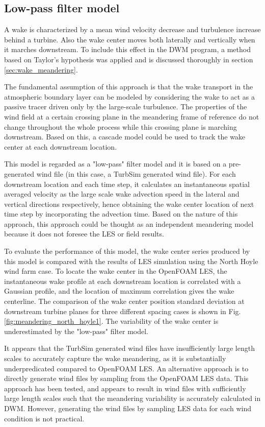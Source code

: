 \documentclass{umthesis}
\begin{document}
\subsection{Low-pass filter model}
A wake is characterized by a mean wind velocity decrease and turbulence increase behind a turbine. Also the wake center moves both laterally and vertically when it marches downstream. To include this effect in the DWM program, a method based on Taylor's hypothesis was applied and is discussed thoroughly in section \ref{sec:wake_meandering}. 

The fundamental assumption of this approach is that the wake transport in the atmospheric boundary layer can be modeled by considering the wake to act as a passive tracer driven only by the large-scale turbulence. The properties of the wind field at a certain crossing plane in the meandering frame of reference do not change throughout the whole process while this crossing plane is marching downstream. Based on this, a cascade model could be used to track the wake center at each downstream location.

This model is regarded as a "low-pass" filter model and it is based on a pre-generated wind file (in this case, a TurbSim generated wind file). For each downstream location and each time step, it calculates an instantaneous spatial averaged velocity as the large scale wake advection speed in the lateral and vertical directions respectively, hence obtaining the wake center location of next time step by incorporating the advection time. Based on the nature of this approach, this approach could be thought as an independent meandering model because it does not foresee the LES or field results.

To evaluate the performance of this model, the wake center series produced by this model is compared with the results of LES simulation using the North Hoyle wind farm case. To locate the wake center in the OpenFOAM LES, the instantaneous wake profile at each downstream location is correlated with a Gaussian profile, and the location of maximum correlation gives the wake centerline. The comparison of the wake center position standard deviation at downstream turbine planes for three different spacing cases is shown in Fig. \ref{fig:meandering_north_hoyle1}. The variability of the wake center is underestimated by the "low-pass" filter model. 

It appears that the TurbSim generated wind files have insufficiently large length scales to accurately capture the wake meandering, as it is substantially underpredicated compared to OpenFOAM LES. An alternative approach is to directly generate wind files by sampling from the OpenFOAM LES data. This approach has been tested, and appears to result in wind files with sufficiently large length scales such that the meandering variability is accurately calculated in DWM. However, generating the wind files by sampling LES data for each wind condition is not practical.   
\end{document}
